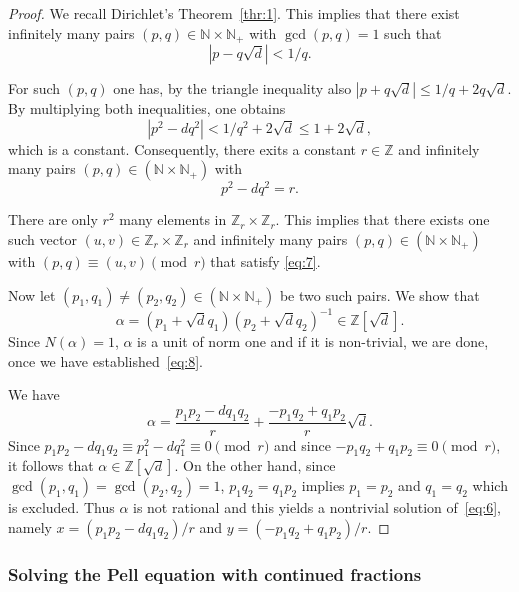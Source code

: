 \documentclass[a4paper,11pt,american]{article}
\theoremstyle{plain}
\theoremstyle{definition}
\begin{document}
\begin{proof}
  We recall Dirichlet's Theorem~\ref{thr:1}. This implies that there exist infinitely many pairs $(p,q) ∈ ℕ × ℕ_+$ with $\gcd(p,q) = 1$ such that 
   \begin{displaymath}
    | p - q \sqrt{d}  | < 1/q. 
  \end{displaymath}

  For such $(p,q)$ one has, by the triangle inequality also  $ | p +  q \sqrt{d}  | ≤ 1/q + 2 q \sqrt{d} $. By multiplying both inequalities, one obtains
  \begin{displaymath}
    | p^2 - d q^2 | <  1/q^2 + 2 \sqrt{d} ≤ 1 + 2 \sqrt{d},
  \end{displaymath}
  which is a constant. Consequently, there exits a constant $r ∈ ℤ$
  and infinitely many pairs $(p,q) ∈(ℕ × ℕ_+)$ with
  \begin{equation}
    \label{eq:7}    
    p^2 - d q^2  = r.
  \end{equation}

  There are only $r^2$ many elements in $ℤ_r × ℤ_r$. This implies that
  there exists one such vector $(u,v) ∈ ℤ_r × ℤ_r$ and infinitely many
  pairs $(p,q) ∈(ℕ × ℕ_+)$ with $(p,q) ≡ (u,v) \pmod{r}$ that satisfy
  \eqref{eq:7}.


  Now let   $(p_1,q_1) ≠  (p_2,q_2) ∈(ℕ × ℕ_+)$ be two such pairs. We show that
  \begin{equation}
    \label{eq:8}   
  α =  (p_1 + \sqrt{d} q_1 ) (p_2 + \sqrt{d} q_2)^{-1} ∈ ℤ[\sqrt{d}]. 
  \end{equation}
  Since $N(α) = 1$, $α$ is a unit of norm one and if it is non-trivial, we are done, once we have established~\eqref{eq:8}.

  We have
  \begin{displaymath}
    α = \frac{p_1 p_2 - d q_1 q_2}{r} + \frac{-p_1q_2 + q_1p_2}{r} \sqrt{d}.  
  \end{displaymath} 
  Since $p_1 p_2 - d q_1 q_2 ≡ p_1^2 - d q_1^2 ≡ 0\pmod{r}$ and since $-p_1q_2 + q_1p_2 ≡ 0 \pmod{r}$, it follows that $α ∈ℤ[\sqrt{d}]$.  On the other hand, since $\gcd(p_1,q_1) =\gcd(p_2,q_2)=1$,   $p_1q_2 = q_1p_2$ implies $p_1 = p_2$ and $q_1 = q_2$ which is excluded. Thus $α$ is not rational and this yields a nontrivial solution of~\eqref{eq:6}, namely $x = (p_1 p_2 - d q_1 q_2)/r$ and $y = (-p_1q_2 + q_1p_2)/{r}$. 
\end{proof}

  \subsubsection*{Solving the Pell equation with continued fractions}
\end{document}
